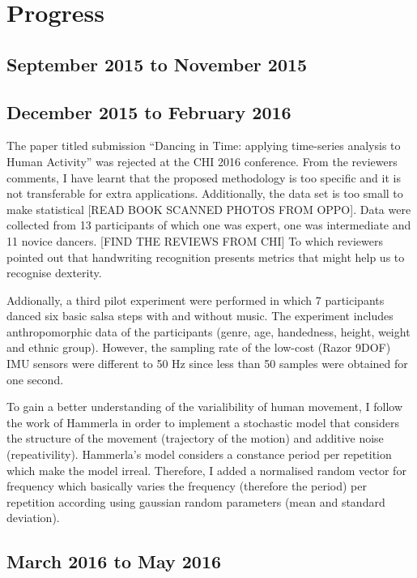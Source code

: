 \documentclass[10pt,journal,onecolumn,compsoc]{IEEEtran}
\begin{document}
\section{Progress}

\subsection{September 2015 to November 2015}


\subsection{December 2015 to February 2016}
The paper titled submission 
``Dancing in Time: applying time-series analysis to Human Activity''
was rejected at the CHI 2016 conference. From the reviewers comments, 
I have learnt that the proposed methodology 
is too specific and it is not transferable for extra applications.
Additionally, the data set is too small to make statistical 
[READ BOOK SCANNED PHOTOS FROM OPPO].
Data were collected from 13 participants of which 
one was expert, one was intermediate and 11 novice dancers.
[FIND THE REVIEWS FROM CHI]
To which reviewers pointed out that handwriting recognition presents metrics 
that might help us to recognise dexterity.

Addionally, a third pilot experiment were performed in which 7 participants danced 
six basic salsa steps with and without music.
The experiment includes anthropomorphic data of the participants 
(genre, age, handedness, height, weight and ethnic group).
However, the sampling rate of the low-cost (Razor 9DOF) IMU sensors were 
different to 50 Hz since less than 50 samples were obtained for one second. 


To gain a better understanding of the varialibility of human movement,
I follow the work of Hammerla in order to implement a stochastic model 
that considers the structure of the movement (trajectory of the motion) and additive noise (repeativility).
Hammerla's model considers a constance period per repetition which make the model irreal.
Therefore, I added a normalised random vector for frequency which basically varies the frequency 
(therefore the period) per repetition according using gaussian random parameters (mean and standard deviation).


\subsection{March 2016 to May 2016}
\end{document}
